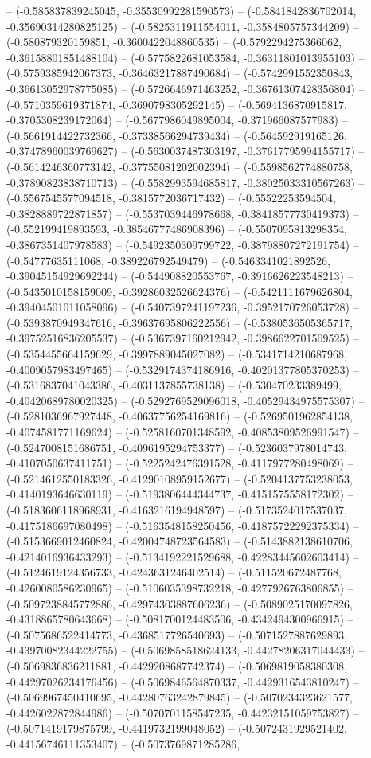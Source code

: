 -- (-0.585837839245045, -0.35530992281590573) -- (-0.5841842836702014, -0.35690314280825125) -- (-0.5825311911554011, -0.3584805757344209) -- (-0.580879320159851, -0.3600422048860535) -- (-0.5792294275366062, -0.36158801851488104) -- (-0.5775822681053584, -0.36311801013955103) -- (-0.5759385942067373, -0.36463217887490684) -- (-0.5742991552350843, -0.36613052978775085) -- (-0.5726646971463252, -0.36761307428356804) -- (-0.5710359619371874, -0.3690798305292145) -- (-0.5694136870915817, -0.3705308239172064) -- (-0.5677986049895004, -0.371966087577983) -- (-0.5661914422732366, -0.37338566294739434) -- (-0.564592919165126, -0.37478960039769627) -- (-0.5630037487303197, -0.37617795994155717) -- (-0.5614246360773142, -0.37755081202002394) -- (-0.5598562774880758, -0.37890823838710713) -- (-0.5582993594685817, -0.38025033310567263) -- (-0.5567545577094518, -0.3815772036717432) -- (-0.55522253594504, -0.3828889722871857) -- (-0.5537039446978668, -0.38418577730419373) -- (-0.552199419893593, -0.38546777486908396) -- (-0.5507095813298354, -0.3867351407978583) -- (-0.5492350309799722, -0.38798807272191754) -- (-0.54777635111068, -0.389226792549479) -- (-0.5463341021892526, -0.39045154929692244) -- (-0.544908820553767, -0.3916626223548213) -- (-0.5435010158159009, -0.39286032526624376) -- (-0.5421111679626804, -0.39404501011058096) -- (-0.5407397241197236, -0.3952170726053728) -- (-0.5393870949347616, -0.39637695806222556) -- (-0.5380536505365717, -0.39752516836205537) -- (-0.5367397160212942, -0.3986622701509525) -- (-0.5354455664159629, -0.3997889045027082) -- (-0.5341714210687968, -0.4009057983497465) -- (-0.5329174374186916, -0.40201377805370253) -- (-0.5316837041043386, -0.4031137855738138) -- (-0.530470233389499, -0.40420689780020325) -- (-0.5292769529096018, -0.40529434975575307) -- (-0.5281036967927448, -0.40637756254169816) -- (-0.5269501962854138, -0.4074581771169624) -- (-0.5258160701348592, -0.40853809526991547) -- (-0.5247008151686751, -0.4096195294753377) -- (-0.5236037978014743, -0.4107050637411751) -- (-0.5225242476391528, -0.4117977280498069) -- (-0.5214612550183326, -0.41290108959152677) -- (-0.5204137753238053, -0.4140193646630119) -- (-0.5193806444344737, -0.4151575558172302) -- (-0.5183606118968931, -0.4163216194948597) -- (-0.5173524017537037, -0.4175186697080498) -- (-0.5163548158250456, -0.41875722292375334) -- (-0.5153669012460824, -0.42004748723564583) -- (-0.5143882138610706, -0.4214016936433293) -- (-0.5134192221529688, -0.42283445602603414) -- (-0.5124619124356733, -0.4243631246402514) -- (-0.511520672487768, -0.4260080586230965) -- (-0.5106035398732218, -0.4277926763806855) -- (-0.5097238845772886, -0.42974303887606236) -- (-0.5089025170097826, -0.4318865780643668) -- (-0.5081700124483506, -0.4342494300966915) -- (-0.5075686522414773, -0.4368517726540693) -- (-0.5071527887629893, -0.43970082344222755) -- (-0.5069858518624133, -0.44278206317044433) -- (-0.5069836836211881, -0.4429208687742374) -- (-0.5069819058380308, -0.44297026234176456) -- (-0.5069846564870337, -0.4429316543810247) -- (-0.5069967450410695, -0.44280763242879845) -- (-0.5070234323621577, -0.4426022872844986) -- (-0.5070701158547235, -0.44232151059753827) -- (-0.5071419179875799, -0.4419732199048052) -- (-0.5072431929521402, -0.44156746111353407) -- (-0.5073769871285286, 